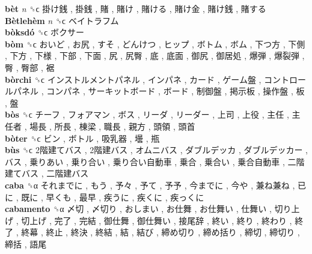 \textbf{bèt} \emph{n}  ␝ϲ   掛け銭 ,  掛銭 ,  賭 ,  賭け ,  賭ける ,  賭け金 ,  賭け銭 ,  賭する   \\
\textbf{Bètlehèm} \emph{n}  ␝ϲ   ベイトラフム   \\
\textbf{bòksdó} ␝ϲ   ボクサー   \\
\textbf{bòm} ␝ϲ   おいど ,  お尻 ,  すそ ,  どんけつ ,  ヒップ ,  ボトム ,  ボム ,  下つ方 ,  下側 ,  下方 ,  下様 ,  下部 ,  下面 ,  尻 ,  尻臀 ,  底 ,  底面 ,  御尻 ,  御居処 ,  爆弾 ,  爆裂弾 ,  臀 ,  臀部 ,  裾   \\
\textbf{bòrchi} ␝ϲ   インストルメントパネル ,  インパネ ,  カード ,  ゲーム盤 ,  コントロールパネル ,  コンパネ ,  サーキットボード ,  ボード ,  制御盤 ,  掲示板 ,  操作盤 ,  板 ,  盤   \\
\textbf{bòs} ␝ϲ   チーフ ,  フォアマン ,  ボス ,  リーダ ,  リーダー ,  上司 ,  上役 ,  主任 ,  主任者 ,  場長 ,  所長 ,  棟梁 ,  職長 ,  親方 ,  頭領 ,  頭首   \\
\textbf{bòter} ␝ϲ   ビン ,  ボトル ,  吸乳器 ,  壜 ,  瓶   \\
\textbf{bùs} ␝ϲ   2階建てバス ,  2階建バス ,  オムニバス ,  ダブルデッカ ,  ダブルデッカー ,  バス ,  乗りあい ,  乗り合い ,  乗り合い自動車 ,  乗合 ,  乗合い ,  乗合自動車 ,  二階建てバス ,  二階建バス   \\
\textbf{caba} ␝α   それまでに ,  もう ,  予々 ,  予て ,  予予 ,  今までに ,  今や ,  兼ね兼ね ,  已に ,  既に ,  早くも ,  最早 ,  疾うに ,  疾くに ,  疾っくに   \\
\textbf{cabamento} ␝α   〆切 ,  〆切り ,  おしまい ,  お仕舞 ,  お仕舞い ,  仕舞い ,  切り上げ ,  切上げ ,  完了 ,  完結 ,  御仕舞 ,  御仕舞い ,  接尾辞 ,  終い ,  終り ,  終わり ,  終了 ,  終幕 ,  終止 ,  終決 ,  終結 ,  結 ,  結び ,  締め切り ,  締め括り ,  締切 ,  締切り ,  締括 ,  語尾   \\
